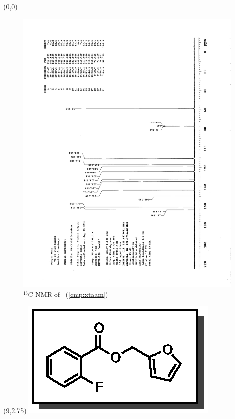 \clearpage
\begin{textblock}{20}(0,0)
\begin{figure}[htb]
\caption{$^{13}$C NMR of  \CMPxtaam\ (\ref{cmp:xtaam})}
\includegraphics[scale=0.75, trim = 0mm 0mm 0mm 5mm,
clip]{chp_asymmetric/images/nmr/xtaamC}
\vspace{-100pt}
\end{figure}
\end{textblock}
\begin{textblock}{1}(9,2.75)
\includegraphics[scale=0.8, angle=90]{chp_asymmetric/images/xtaam}
\end{textblock}
